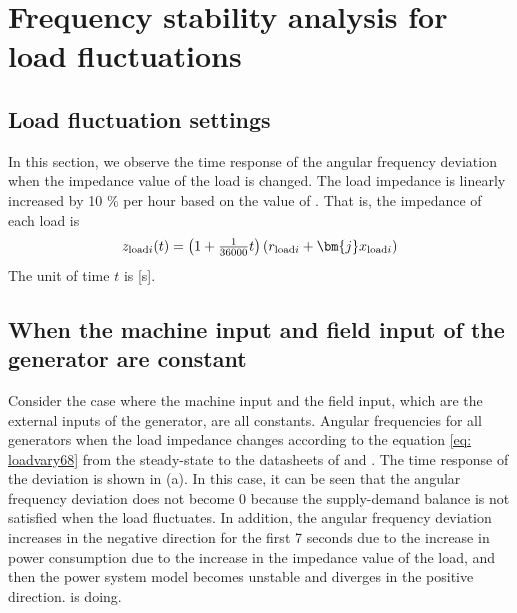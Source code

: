 \documentclass[tombow,dvipdfmx]{corona-a5-1.1}
\begin{document}
\section{Frequency stability analysis for load fluctuations}\label{sec:IEEE68AGC}

\subsection{Load fluctuation settings}

In this section, we observe the time response of the angular frequency deviation when the impedance value of the load is changed.
The load impedance is linearly increased by 10 \% per hour based on the value of .
That is, the impedance of each load is
\begin{align}\label{eq:loadvary68}
z_{{\rm load}i}(t) = \left(1+\tfrac{1}{36000}t \right) \left( r_{{\rm load}i} + \bm{j} x_{{\rm load}i} \right)
\end{align}
The unit of time $ t $ is [s].

\subsection{When the machine input and field input of the generator are constant}\label{sec:constPV}

Consider the case where the machine input and the field input, which are the external inputs of the generator, are all constants.
Angular frequencies for all generators when the load impedance changes according to the equation \ref{eq: loadvary68} from the steady-state to the datasheets of  and . The time response of the deviation is shown in (a).
In this case, it can be seen that the angular frequency deviation does not become 0 because the supply-demand balance is not satisfied when the load fluctuates.
In addition, the angular frequency deviation increases in the negative direction for the first 7 seconds due to the increase in power consumption due to the increase in the impedance value of the load, and then the power system model becomes unstable and diverges in the positive direction. is doing.
\end{document}

